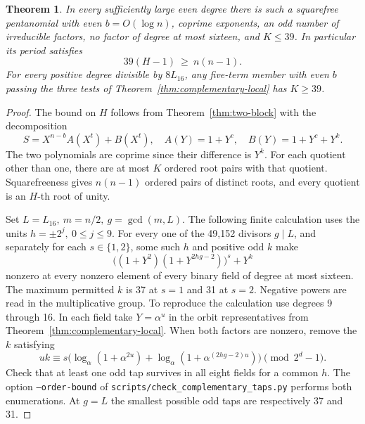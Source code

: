 \documentclass[11pt]{article}
\newtheorem{theorem}{Theorem}
\begin{document}
\begin{theorem}\label{thm:local-quadratic-order}
In every sufficiently large even degree there is such a squarefree
pentanomial with even \(b=O(\log n)\), coprime exponents, an odd
number of irreducible factors, no factor of degree at most sixteen,
and \(K\le39\). In particular its period satisfies
\[
                           39(H-1)\ \ge\ n(n-1).
\]
For every positive degree divisible by \(8L_{16}\), any five-term
member with even \(b\) passing the three tests of
Theorem~\ref{thm:complementary-local} has \(K\ge39\).
\end{theorem}
\begin{proof}
The bound on \(H\) follows from Theorem~\ref{thm:two-block} with
the decomposition
\[
 S=X^{n-b}A(X^t)+B(X^t),\quad A(Y)=1+Y^c,\quad
 B(Y)=1+Y^c+Y^k .
\]
The two polynomials are coprime since their difference is \(Y^k\).
For each quotient other than one, there are at most \(K\) ordered
root pairs with that quotient. Squarefreeness gives \(n(n-1)\)
ordered pairs of distinct roots, and every quotient is an
\(H\)-th root of unity.

Set \(L=L_{16},\ m=n/2,\ g=\gcd(m,L)\). The following finite
calculation uses the units \(h=\pm2^j,\ 0\le j\le9\). For every
one of the 49,152 divisors \(g\mid L\), and separately for each
\(s\in\{1,2\}\), some such \(h\) and positive odd \(k\) make
\[
       \big((1+Y^2)(1+Y^{2hg-2})\big)^s+Y^k
\]
nonzero at every nonzero element of every binary field of degree
at most sixteen. The maximum permitted \(k\) is 37 at \(s=1\)
and 31 at \(s=2\). Negative powers are read in the multiplicative
group. To reproduce the calculation use degrees 9 through 16.
In each field take \(Y=\alpha^u\) in the orbit representatives from
Theorem~\ref{thm:complementary-local}. When both factors are nonzero,
remove the \(k\) satisfying
\[
 uk\equiv s\big(\log_\alpha(1+\alpha^{2u})+
               \log_\alpha(1+\alpha^{(2hg-2)u})\big)
                  \pmod{2^d-1}.
\]
Check that at least one odd tap survives in all eight fields for
a common \(h\). The option \texttt{--order-bound} of
\nolinkurl{scripts/check_complementary_taps.py} performs both
enumerations. At \(g=L\) the smallest possible odd taps are
respectively 37 and 31.


\end{proof}
\end{document}
